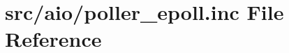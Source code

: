 \hypertarget{poller__epoll_8inc}{}\section{src/aio/poller\+\_\+epoll.inc File Reference}
\label{poller__epoll_8inc}
